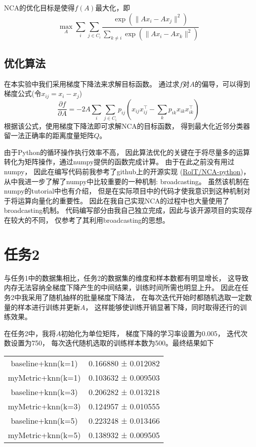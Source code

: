 \documentclass[a4paper,UTF8]{article}
\theoremstyle{definition}
\begin{document}
NCA的优化目标是使得$f(A)$最大化，即
\[
	\max_{A} \sum_{i} \sum_{j \in C_{i}}
	\frac{\exp(\lVert Ax_{i} - Ax_{j} \rVert^2)}
	{\sum_{k \neq i} \exp(\lVert Ax_{i} - Ax_{k} \rVert^2)}
\]

\subsection*{优化算法}

在本实验中我们采用梯度下降法来求解目标函数。
通过求$f$对$A$的偏导，可以得到梯度公式(令$x_{ij} = x_{i} - x_{j}$)
\[
	\frac{\partial f}{\partial A} =
	-2A \sum_{i} \sum_{j \in C_{i}}
	p_{ij}( x_{ij} x_{ij}^\top - \sum_{k} p_{ik} x_{ik} x_{ik}^\top)
\]
根据该公式，使用梯度下降法即可求解NCA的目标函数，
得到最大化近邻分类器留一法正确率的距离度量矩阵$Q$。

由于Python的循环操作执行效率不高，
因此算法优化的关键在于将尽量多的运算转化为矩阵操作，通过numpy提供的函数完成计算。
由于在此之前没有用过numpy，
因此在编写代码前我参考了github上的开源实现
(\href{https://github.com/RolT/NCA-python}{RolT/NCA-python})，
从中我进一步了解了numpy中比较重要的一种机制: broadcasting。
虽然该机制在numpy的tutorial中也有介绍，
但是在实际项目中的代码才使我意识到这种机制对于将运算向量化的重要性。
因此在我自己实现NCA的过程中也大量使用了broadcasting机制。
代码编写部分由我自己独立完成，因此与该开源项目的实现存在较大的不同，
仅参考了其利用broadcasting的思想。

\section*{任务2}

与任务1中的数据集相比，任务2的数据集的维度和样本数都有明显增长，
这导致内存无法容纳全梯度下降产生的中间结果，训练时间所需也明显上升。
因此在任务2中我采用了随机抽样的批量梯度下降法，
在每次迭代开始时都随机选取一定数量的样本进行训练并更新$A$，
这样能够使训练开销显著下降，同时取得还行的训练效果。

在任务2中，我将$A$初始化为单位矩阵，
梯度下降的学习率设置为0.005，
迭代次数设置为750，
每次迭代随机选取的训练样本数为500。最终结果如下

\begin{tabularx}{\textwidth}{c X}
\hline
baseline+knn(k=1) & 0.166880 ± 0.012082 \\
myMetric+knn(k=1) & 0.103632 ± 0.009503 \\
baseline+knn(k=3) & 0.206282 ± 0.013218 \\
myMetric+knn(k=3) & 0.124957 ± 0.010555 \\
baseline+knn(k=5) & 0.223248 ± 0.013466 \\
myMetric+knn(k=5) & 0.138932 ± 0.009505 \\
\hline
\end{tabularx}

\nocite{*}

\end{document}
